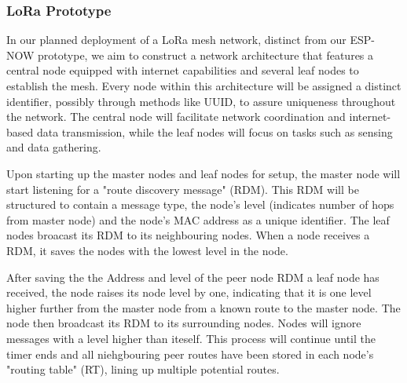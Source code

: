 \subsubsection{LoRa Prototype}

In our planned deployment of a LoRa mesh network, distinct from our ESP-NOW prototype, we aim to construct a network architecture that features a central node equipped with internet capabilities and several leaf nodes to establish the mesh. Every node within this architecture will be assigned a distinct identifier, possibly through methods like UUID, to assure uniqueness throughout the network. The central node will facilitate network coordination and internet-based data transmission, while the leaf nodes will focus on tasks such as sensing and data gathering.


Upon starting up the master nodes and leaf nodes for setup, the master node will start listening for a "route discovery message" (RDM). This RDM will be structured to contain a message type, the node's level (indicates number of hops from master node) and the node's MAC address as a unique identifier. The leaf nodes broacast its RDM to its neighbouring nodes. When a node receives a RDM, it saves the nodes with the lowest level in the node. 


After saving the the Address and level of the peer node RDM a leaf node has received, the node raises its node level by one, indicating that it is one level higher further from the master node from a known route to the master node. The node then broadcast its RDM to its surrounding nodes. Nodes will ignore messages with a level higher than iteself. This process will continue until the timer ends and all niehgbouring peer routes have been stored in each node's "routing table" (RT), lining up multiple potential routes.

